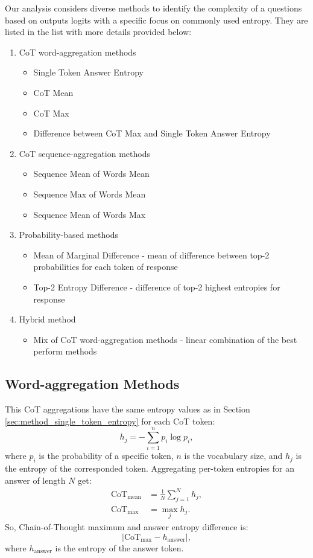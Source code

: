 Our analysis considers diverse methods to identify the complexity of a questions based on outputs logits with a specific focus on commonly used entropy.
They are listed in the list with more details provided below:
\begin{enumerate}
    \item CoT word-aggregation methods
    \begin{itemize}
        \item Single Token Answer Entropy
        \item CoT Mean
        \item CoT Max
        \item Difference between CoT Max and Single Token Answer Entropy
    \end{itemize}
    \item CoT sequence-aggregation methods
    \begin{itemize}
        \item Sequence Mean of Words Mean 
        \item Sequence Max of Words Mean
        \item Sequence Mean of Words Max
    \end{itemize}
    \item Probability-based methods
    \begin{itemize}
        \item Mean of Marginal Difference - mean of difference between top-2 probabilities for each token of response
        \item Top-2 Entropy Difference - difference of top-2 highest entropies for response
    \end{itemize}
    \item Hybrid method
    \begin{itemize}
        \item Mix of CoT word-aggregation methods - linear combination of the best perform methods
    \end{itemize}
\end{enumerate}

\subsection{Word-aggregation Methods}
This CoT aggregations have the same entropy values as in Section \ref{sec:method_single_token_entropy} for each CoT token:
$$
h_j = -\sum_{i=1}^{n} p_i \log{p_i},
$$
where $p_i$ is the probability of a specific token, $n$ is the vocabulary size, and $h_j$ is the entropy of the corresponded token.
Aggregating per-token entropies for an answer of length $N$ get:
\begin{align*}
\mathrm{CoT}_{\mathrm{mean}} &= \frac{1}{N} \sum_{j=1}^{N} h_j, \\
\mathrm{CoT}_{\mathrm{max}} &= \max_j h_j.
\end{align*}
So, Chain-of-Thought maximum and answer entropy difference is:
$$
|\mathrm{CoT}_{\mathrm{max}}  - h_{\mathrm{answer}}|,
$$
where $h_{\mathrm{answer}}$ is the entropy of the answer token.

